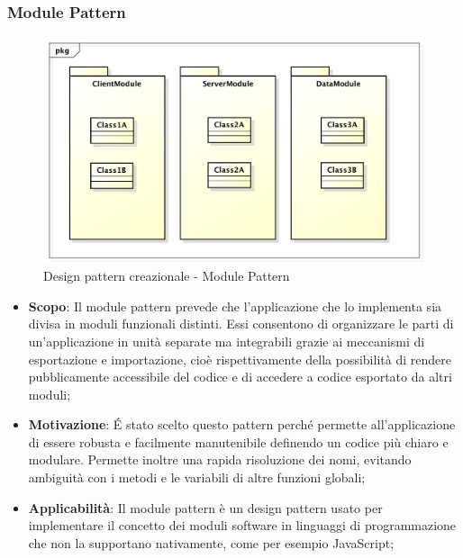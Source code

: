 		\subsubsection{Module Pattern} %
		\begin{figure}[htbp]
			\centering
			\centerline{\includegraphics[scale=0.5]{./images/designpatternappendice/module_pattern.pdf}}
			\caption{Design pattern creazionale - Module Pattern}
		\end{figure}

		\begin{itemize}
			\item \textbf{Scopo}: Il module pattern prevede che l'applicazione che lo implementa sia divisa in moduli funzionali distinti. Essi consentono di organizzare le parti di un’applicazione in unità separate ma integrabili grazie ai meccanismi di esportazione e importazione, cioè rispettivamente della possibilità di rendere pubblicamente accessibile del codice e di accedere a codice esportato da altri moduli;

			\item \textbf{Motivazione}: \'E stato scelto questo pattern perché permette all'applicazione di essere robusta e facilmente manutenibile definendo un codice più chiaro e modulare. Permette inoltre una rapida risoluzione dei nomi, evitando ambiguità con i metodi e le variabili di altre funzioni globali;

			\item \textbf{Applicabilità}: Il module pattern è un design pattern usato per implementare il concetto dei moduli software in linguaggi di programmazione che non la supportano nativamente, come per esempio JavaScript;

		\end{itemize}


